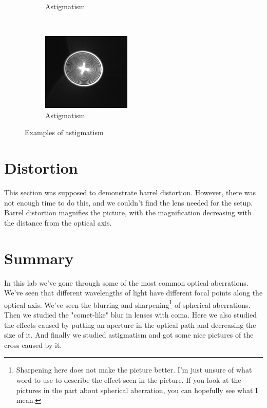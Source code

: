 \documentclass[a4paper,12pt]{article}
\begin{document}
\begin{figure}[H]
\begin{subfigure}{0.3\textwidth}
                \caption{Astigmatism}
                \label{fig:astig2}
        \end{subfigure}%
        ~ %
        \begin{subfigure}{0.3\textwidth}
                \includegraphics[width=\textwidth]{astig_3}
                \caption{Astigmatism}
                \label{fig:astig3}
        \end{subfigure}
        \caption{Examples of astigmatism}\label{fig:Astigmatism}
\end{figure}

\section{Distortion}
This section was supposed to demonstrate barrel distortion. However, there was not enough time to do this, and we couldn't find the lens needed for the setup. Barrel distortion magnifies the picture, with the magnification decreasing with the distance from the optical axis.

\section{Summary}
In this lab we've gone through some of the most common optical aberrations. We've seen that different wavelengths of light have different focal points along the optical axis. We've seen the blurring and sharpening\footnote{Sharpening here does not make the picture better. I'm just unsure of what word to use to describe the effect seen in the picture. If you look at the pictures in the part about spherical aberration, you can hopefully see what I mean.} of spherical aberrations. Then we studied the "comet-like" blur in lenses with coma. Here we also studied the effects caused by putting an aperture in the optical path and decreasing the size of it. And finally we studied astigmatism and got some nice pictures of the cross caused by it.
\end{document}
